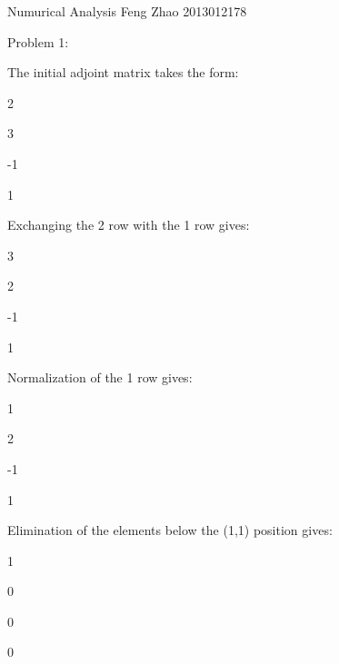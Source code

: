 \documentclass{article}
\begin{document}
\bigskip Numurical Analysis Feng Zhao 2013012178

Problem 1:

The initial adjoint matrix takes the form:

2\qquad \TEXTsymbol{\vert}\qquad

3\qquad \TEXTsymbol{\vert}\qquad

-1\qquad \TEXTsymbol{\vert}\qquad

1\qquad \TEXTsymbol{\vert}\qquad

Exchanging the 2 row with the 1 row gives:

3\qquad \TEXTsymbol{\vert}\qquad

2\qquad \TEXTsymbol{\vert}\qquad

-1\qquad \TEXTsymbol{\vert}\qquad

1\qquad \TEXTsymbol{\vert}\qquad

Normalization of the 1 row gives:

1\qquad \TEXTsymbol{\vert}\qquad

2\qquad \TEXTsymbol{\vert}\qquad

-1\qquad \TEXTsymbol{\vert}\qquad

1\qquad \TEXTsymbol{\vert}\qquad

Elimination of the elements below the (1,1) position gives:

1\qquad \TEXTsymbol{\vert}\qquad

0\qquad \TEXTsymbol{\vert}\qquad

0\qquad \TEXTsymbol{\vert}\qquad

0\qquad \TEXTsymbol{\vert}\qquad
\end{document}

